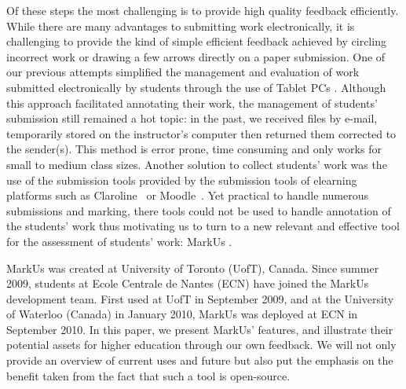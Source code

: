 \documentclass[twocolumn,10pt]{asme2e}
\begin{document}
Of these steps the most challenging is to provide high quality feedback efficiently. While there are many advantages to submitting work electronically, it is challenging to provide the kind of simple efficient feedback achieved by circling incorrect work or drawing a few arrows directly on a paper submission. One of our previous attempts simplified the management and evaluation of work submitted electronically by students through the use of Tablet PCs \cite{magnin-tice-2010}. Although this approach facilitated annotating their work, the management of students' submission still remained a hot topic: in the past, we received files by e-mail, temporarily stored on the instructor's computer then returned them corrected to the sender(s). This method is error prone, time consuming and only works for small to medium class sizes. Another solution to collect students' work was the use of the submission tools provided by the submission tools of elearning platforms such as Claroline~\cite{claroline} or Moodle~\cite{moodle}. Yet practical to handle numerous submissions and marking, there tools could not be used to handle  annotation of the students' work thus motivating us to turn to a new relevant and effective tool for the assessment of students' work: MarkUs \cite{markus}.

MarkUs was created at University of Toronto (UofT), Canada. Since summer 2009, students at Ecole Centrale de Nantes (ECN) have joined the MarkUs development team. First used at UofT in September 2009, and at the University of Waterloo (Canada) in January 2010, MarkUs was deployed at ECN in September 2010. In this paper, we present MarkUs' features, and illustrate their potential assets for higher education through our own feedback. We will not only provide an overview of current uses and future but also put the emphasis on the benefit taken from the fact that such a tool is open-source. 
\end{document}
